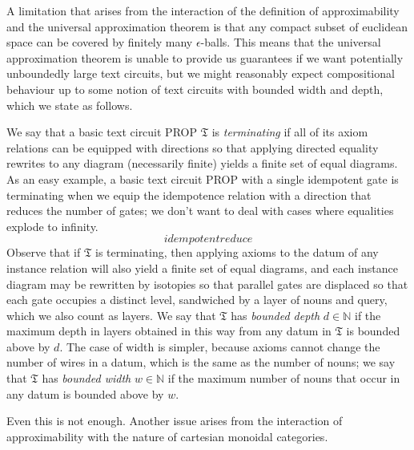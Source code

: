 \begin{fullwidth}
\begin{example}

\end{example}

A limitation that arises from the interaction of the definition of approximability and the universal approximation theorem is that any compact subset of euclidean space can be covered by finitely many $\epsilon$-balls. This means that the universal approximation theorem is unable to provide us guarantees if we want potentially unboundedly large text circuits, but we might reasonably expect compositional behaviour up to some notion of text circuits with bounded width and depth, which we state as follows.

\begin{defn}
We say that a basic text circuit PROP $\mathfrak{T}$ is \emph{terminating} if all of its axiom relations can be equipped with directions so that applying directed equality rewrites to any diagram (necessarily finite) yields a finite set of equal diagrams. As an easy example, a basic text circuit PROP with a single idempotent gate is terminating when we equip the idempotence relation with a direction that reduces the number of gates; we don't want to deal with cases where equalities explode to infinity.
\[idempotentreduce\]
Observe that if $\mathfrak{T}$ is terminating, then applying axioms to the datum of any instance relation will also yield a finite set of equal diagrams, and each instance diagram may be rewritten by isotopies so that parallel gates are displaced so that each gate occupies a distinct level, sandwiched by a layer of nouns and query, which we also count as layers. We say that $\mathfrak{T}$ has \emph{bounded depth} $d \in \mathbb{N}$ if the maximum depth in layers obtained in this way from any datum in $\mathfrak{T}$ is bounded above by $d$. The case of width is simpler, because axioms cannot change the number of wires in a datum, which is the same as the number of nouns; we say that $\mathfrak{T}$ has \emph{bounded width} $w \in \mathbb{N}$ if the maximum number of nouns that occur in any datum is bounded above by $w$.
\end{defn}

Even this is not enough. Another issue arises from the interaction of approximability with the nature of cartesian monoidal categories.

\begin{theorem}


\end{theorem}
\end{fullwidth}
